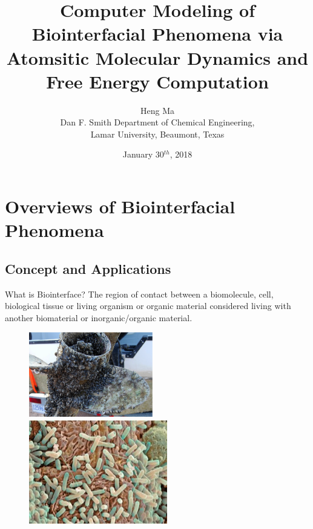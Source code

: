 \documentclass{beamer}
\title{Computer Modeling of Biointerfacial Phenomena via Atomsitic Molecular Dynamics and Free Energy Computation}
\author{Heng Ma \\ {\small Dan F. Smith Department of Chemical Engineering,\\ Lamar University, Beaumont, Texas}}
\date{January 30$^{th}$, 2018}
\begin{document}
\begin{frame}
  \titlepage
\end{frame}

\begin{frame}
  \tableofcontents
\end{frame}



\section{Overviews of Biointerfacial Phenomena}

\subsection{Concept and Applications}

\begin{frame}{What is Biointerface?}
The region of contact between a biomolecule, cell, biological tissue or living organism or organic material considered living with another biomaterial or inorganic/organic material. 
\begin{figure}
\includegraphics[width=0.48\textwidth]{Pics/Prop.png}
\hfill
\includegraphics[width=0.48\textheight]{Pics/Ecoli.jpg}
\end{figure}
\end{frame}
\end{document}
